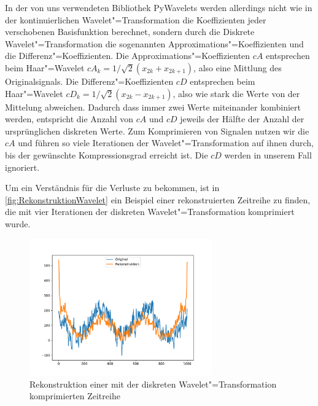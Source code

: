 In der von uns verwendeten Bibliothek PyWavelets \cite{pyWavelets} werden allerdings nicht wie in der kontinuierlichen Wavelet"=Transformation die Koeffizienten jeder verschobenen Basisfunktion berechnet, sondern durch die Diskrete Wavelet"=Transformation die sogenannten Approximations"=Koeffizienten und die Differenz"=Koeffizienten. Die Approximations"=Koeffizienten $cA$ entsprechen beim Haar"=Wavelet $cA_k = 1/\sqrt{2}(x_{2k} + x_{2k+1})$, also eine Mittlung des Originalsignals. Die Differenz"=Koeffizienten $cD$ entsprechen beim Haar"=Wavelet $cD_k = 1/\sqrt{2}(x_{2k}-x_{2k+1})$, also wie stark die Werte von der Mittelung abweichen. Dadurch dass immer zwei Werte miteinander kombiniert werden, entspricht die Anzahl von $cA$ und $cD$ jeweils der Hälfte der Anzahl der ursprünglichen diskreten Werte. Zum Komprimieren von Signalen nutzen wir die $cA$ und führen so viele Iterationen der Wavelet"=Transformation auf ihnen durch, bis der gewünschte Kompressionsgrad erreicht ist. Die $cD$ werden in unserem Fall ignoriert.

Um ein Verständnis für die Verluste zu bekommen, ist in \autoref{fig:RekonstruktionWavelet} ein Beispiel einer rekonstruierten Zeitreihe zu finden, die mit vier Iterationen der diskreten Wavelet"=Transformation komprimiert wurde.
\begin{figure}[bth] 
  \centering
  \includegraphics[width=0.7\textwidth]{Graphics/RekonstruktionFourier.pdf}
  \caption{Rekonstruktion einer mit der diskreten Wavelet"=Transformation komprimierten Zeitreihe}
  \label{fig:RekonstruktionWavelet}
\end{figure}